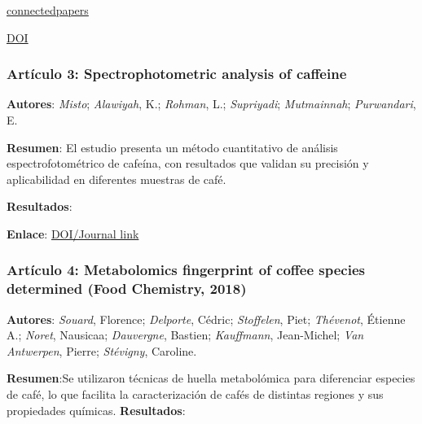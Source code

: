 \documentclass{article}
\begin{document}
\href{https://www.connectedpapers.com/main/5135ae6a3d92e94d6bc22e4c8575d759a8763676/Measurement-of-caffeine-in-coffee-beans-with-UV%2Fvis-spectrometer/graph}{connectedpapers} \vspace{0.5cm}

\href{https://doi.org/10.1016/j.foodchem.2007.10.024}{DOI} \vspace{0.5cm}


\subsubsection{\textbf{Artículo 3:} \textcolor{Sun}{\textbf{Spectrophotometric analysis of caffeine}}} \vspace{0.5cm}

\textbf{Autores}: \textit{Misto}; \textit{Alawiyah}, K.; \textit{Rohman}, L.; \textit{Supriyadi}; \textit{Mutmainnah}; \textit{Purwandari}, E. \vspace{0.5cm}

\textbf{Resumen}: El estudio presenta un método cuantitativo de análisis espectrofotométrico de cafeína, con resultados que validan su precisión y aplicabilidad en diferentes muestras de café. \vspace{0.5cm}

\textbf{Resultados}: \vspace{0.5cm}

\textbf{Enlace}: \href{https://doi.org/xxxxxx}{DOI/Journal link} \vspace{0.5cm}

\subsubsection{\textbf{Artículo 4:} \textcolor{Pesto}{\textbf{Metabolomics fingerprint of coffee species determined (Food Chemistry, 2018)}}} \vspace{0.5cm}

\textbf{Autores}: \textit{Souard}, Florence; \textit{Delporte}, C\'edric; \textit{Stoffelen}, Piet; \textit{Th\'evenot}, {\'E}tienne A.; \textit{Noret}, Nausicaa; \textit{Dauvergne}, Bastien; \textit{Kauffmann}, Jean-Michel; \textit{Van Antwerpen}, Pierre; \textit{St\'evigny}, Caroline. \vspace{0.5cm}


\textbf{Resumen}:Se utilizaron técnicas de huella metabolómica para diferenciar especies de café, lo que facilita la caracterización de cafés de distintas regiones y sus propiedades químicas. \vspace{0.5cm}
\textbf{Resultados}: \vspace{0.5cm}
\end{document}
